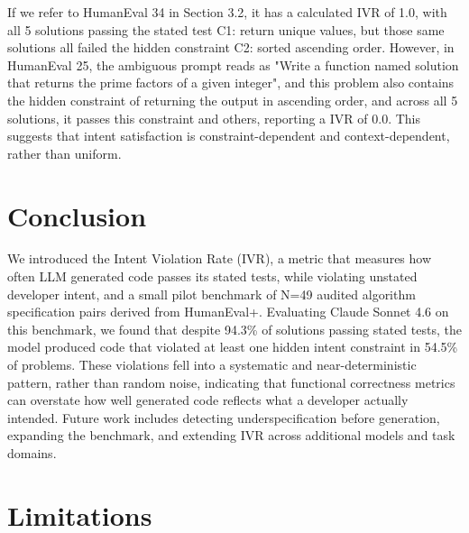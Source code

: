 \documentclass[11pt]{article}
\begin{document}
If we refer to HumanEval 34 in Section 3.2, it has a calculated IVR of 1.0, with all 5 solutions passing the stated test C1: return unique values, but those same solutions all failed the hidden constraint C2: sorted ascending order. However, in HumanEval 25, the ambiguous prompt reads as "Write a function named solution that returns the prime factors of a given integer", and this problem also contains the hidden constraint of returning the output in ascending order, and across all 5 solutions, it passes this constraint and others, reporting a IVR of 0.0. This suggests that intent satisfaction is constraint-dependent and context-dependent, rather than uniform. 

\section{Conclusion}

We introduced the Intent Violation Rate (IVR), a metric that measures how often LLM generated code passes its stated tests, while violating unstated developer intent, and a small pilot benchmark of N=49 audited algorithm specification pairs derived from HumanEval+. Evaluating Claude Sonnet 4.6 on this benchmark, we found that despite 94.3\% of solutions passing stated tests, the model produced code that violated at least one hidden intent constraint in 54.5\% of problems. These violations fell into a systematic and near-deterministic pattern, rather than random noise, indicating that functional correctness metrics can overstate how well generated code reflects what a developer actually intended. Future work includes detecting underspecification before generation, expanding the benchmark, and extending IVR across additional models and task domains. 

\section*{Limitations}
\end{document}
